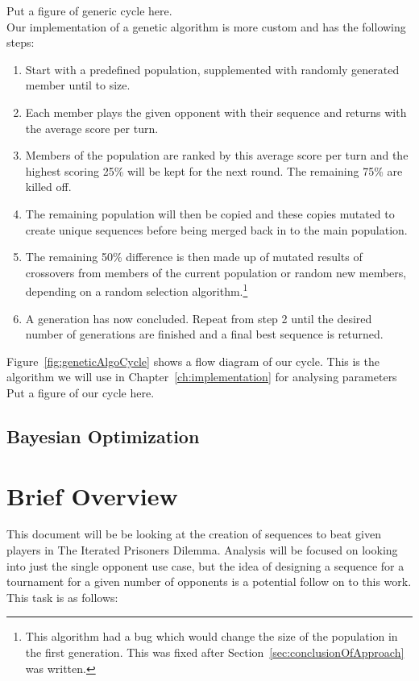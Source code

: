Put a figure of generic cycle here.\label{fig:genericGeneticAlgoCycle} \\

Our implementation of a genetic algorithm is more custom and has the following steps:
\begin{enumerate}
    \item Start with a predefined population, supplemented with randomly generated member until to size.
    \item Each member plays the given opponent with their sequence and returns with the average score per turn.
    \item Members of the population are ranked by this average score per turn and the highest scoring 25\% will be kept for the next round.
    The remaining 75\% are killed off.
    \item The remaining population will then be copied and these copies mutated to create unique sequences before being merged back in to the main population.
    \item The remaining 50\% difference is then made up of mutated results of crossovers from members of the current population or random new members, depending on a random selection algorithm.\footnote{This algorithm had a bug which would change the size of the population in the first generation.
    This was fixed after Section~\ref{sec:conclusionOfApproach} was written.}
    \item A generation has now concluded.
    Repeat from step 2 until the desired number of generations are finished and a final best sequence is returned.
\end{enumerate}
Figure~\ref{fig:geneticAlgoCycle} shows a flow diagram of our cycle.
This is the algorithm we will use in Chapter~\ref{ch:implementation} for analysing parameters\\

Put a figure of our cycle here.\label{fig:geneticAlgoCycle} \\

\subsection{Bayesian Optimization}\label{subsec:bayesianOptimization}
\section{Brief Overview}\label{sec:briefOverview}
This document will be be looking at the creation of sequences to beat given players in The Iterated Prisoners Dilemma.
Analysis will be focused on looking into just the single opponent use case, but the idea of designing a sequence for a tournament for a given number of opponents is a potential follow on to this work.
This task is as follows:\\

